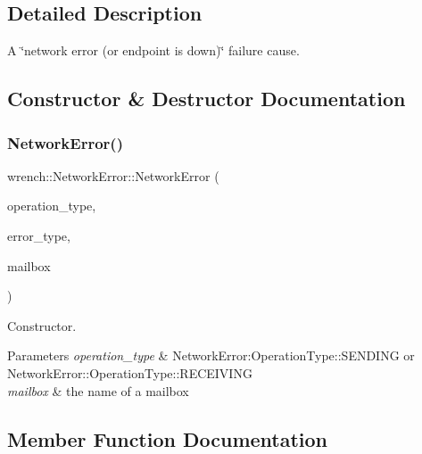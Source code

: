 \subsection{Detailed Description}
A \char`\"{}network error (or endpoint is down)\char`\"{} failure cause. 

\subsection{Constructor \& Destructor Documentation}
\mbox{\label{classwrench_1_1_network_error_ac7718f7a5172d75aeee99b320ddc5487}} 
\subsubsection{\texorpdfstring{Network\+Error()}{NetworkError()}}
{\footnotesize\ttfamily wrench\+::\+Network\+Error\+::\+Network\+Error (\begin{DoxyParamCaption}\item[{\hyperlink{classwrench_1_1_network_error_a18331f823c565c53be139bdac90437d8}{Network\+Error\+::\+Operation\+Type}}]{operation\+\_\+type,  }\item[{\hyperlink{classwrench_1_1_network_error_a17ec7046bb91ea4e909c3bf59d46f09b}{Network\+Error\+::\+Error\+Type}}]{error\+\_\+type,  }\item[{std\+::string}]{mailbox }\end{DoxyParamCaption})}



Constructor. 


\begin{DoxyParams}{Parameters}
{\em operation\+\_\+type} & Network\+Error\+:\+Operation\+Type\+:\+:S\+E\+N\+D\+I\+NG or Network\+Error\+::\+Operation\+Type\+::\+R\+E\+C\+E\+I\+V\+I\+NG \\
\hline
{\em mailbox} & the name of a mailbox \\
\hline
\end{DoxyParams}


\subsection{Member Function Documentation}
\mbox{\label{classwrench_1_1_network_error_a0760db02c40d2ba195aa87106951411f}} 
